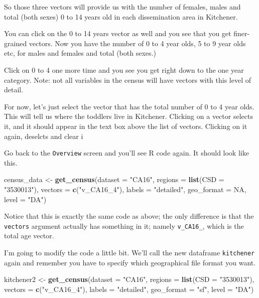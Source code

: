\documentclass[
]{article}
\newenvironment{Shaded}{\begin{snugshade}}{\end{snugshade}}
\newcommand{\DataTypeTok}[1]{\textcolor[rgb]{0.13,0.29,0.53}{#1}}
\newcommand{\KeywordTok}[1]{\textcolor[rgb]{0.13,0.29,0.53}{\textbf{#1}}}
\newcommand{\NormalTok}[1]{#1}
\newcommand{\OtherTok}[1]{\textcolor[rgb]{0.56,0.35,0.01}{#1}}
\newcommand{\StringTok}[1]{\textcolor[rgb]{0.31,0.60,0.02}{#1}}
\begin{document}
So those three vectors will provide us with the number of females, males
and total (both sexes) 0 to 14 years old in each dissemination area in
Kitchener.

You can click on the 0 to 14 years vector as well and you see that you
get finer-grained vectors. Now you have the number of 0 to 4 year olds,
5 to 9 year olds etc, for males and females and total (both sexes.)

Click on 0 to 4 one more time and you see you get right down to the one
year category. Note: not all variables in the census will have vectors
with this level of detail.

For now, let's just select the vector that has the total number of 0 to
4 year olds. This will tell us where the toddlers live in Kitchener.
Clicking on a vector selects it, and it should appear in the text box
above the list of vectors. Clicking on it again, deselcts and clear i

Go back to the \texttt{Overview} screen and you'll see R code again. It
should look like this.

\begin{Shaded}
\begin{Highlighting}[]
\NormalTok{census\_data <{-}}\StringTok{ }\KeywordTok{get\_census}\NormalTok{(}\DataTypeTok{dataset =} \StringTok{"CA16"}\NormalTok{, }\DataTypeTok{regions =} \KeywordTok{list}\NormalTok{(}\DataTypeTok{CSD =} \StringTok{"3530013"}\NormalTok{), }\DataTypeTok{vectors =} \KeywordTok{c}\NormalTok{(}\StringTok{"v\_CA16\_4"}\NormalTok{), }
    \DataTypeTok{labels =} \StringTok{"detailed"}\NormalTok{, }\DataTypeTok{geo\_format =} \OtherTok{NA}\NormalTok{, }\DataTypeTok{level =} \StringTok{"DA"}\NormalTok{)}
\end{Highlighting}
\end{Shaded}

Notice that this is exactly the same code as above; the only difference
is that the \texttt{vectors} argument actually has something in it;
namely \texttt{v\_CA16\_}, which is the total age vector.

I'm going to modify the code a little bit. We'll call the new dataframe
\texttt{kitchener} again and remember you have to specify which
geographical file format you want.

\begin{Shaded}
\begin{Highlighting}[]
\NormalTok{kitchener2 <{-}}\StringTok{ }\KeywordTok{get\_census}\NormalTok{(}\DataTypeTok{dataset =} \StringTok{"CA16"}\NormalTok{, }\DataTypeTok{regions =} \KeywordTok{list}\NormalTok{(}\DataTypeTok{CSD =} \StringTok{"3530013"}\NormalTok{), }\DataTypeTok{vectors =} \KeywordTok{c}\NormalTok{(}\StringTok{"v\_CA16\_4"}\NormalTok{), }
    \DataTypeTok{labels =} \StringTok{"detailed"}\NormalTok{, }\DataTypeTok{geo\_format =} \StringTok{"sf"}\NormalTok{, }\DataTypeTok{level =} \StringTok{"DA"}\NormalTok{)}
\end{Highlighting}
\end{Shaded}
\end{document}
